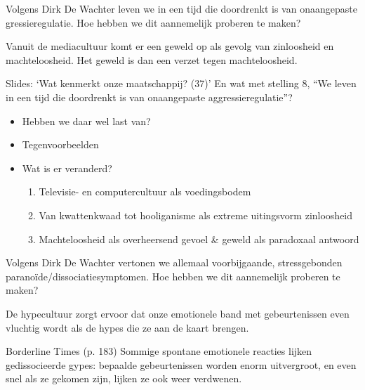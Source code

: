 \documentclass[main.tex]{subfiles}
\begin{document}
\begin{examenvraag}
    \begin{vraag}
        Volgens Dirk De Wachter leven we in een tijd die doordrenkt is van onaangepaste gressieregulatie. Hoe hebben we dit aannemelijk proberen te maken?
    \end{vraag}

    \begin{antwoord}
        Vanuit de mediacultuur komt er een geweld op als gevolg van zinloosheid en machteloosheid.
        Het geweld is dan een verzet tegen machteloosheid.
        \begin{citaat}{Slides: `Wat kenmerkt onze maatschappij? (37)'}
            En wat met stelling 8, ``We leven in een tijd die doordrenkt is van onaangepaste aggressieregulatie''?
            \begin{itemize}
                \item Hebben we daar wel last van?
                \item Tegenvoorbeelden
                \item Wat is er veranderd?
                    \begin{enumerate}
                        \item Televisie- en computercultuur als voedingsbodem
                        \item Van kwattenkwaad tot hooliganisme als extreme uitingsvorm zinloosheid
                        \item Machteloosheid als overheersend gevoel \& geweld als paradoxaal antwoord
                    \end{enumerate}
            \end{itemize}
        \end{citaat}
    \end{antwoord}
\end{examenvraag}


\begin{examenvraag}
    \begin{vraag}
        Volgens Dirk De Wachter vertonen we allemaal voorbijgaande, stressgebonden paranoïde/dissociatiesymptomen. Hoe hebben we dit aannemelijk proberen te maken?
    \end{vraag}

    \begin{antwoord}
        De hypecultuur zorgt ervoor dat onze emotionele band met gebeurtenissen even vluchtig wordt als de hypes die ze aan de kaart brengen.
        \begin{citaat}{Borderline Times (p. 183)}
            Sommige spontane emotionele reacties lijken gedissocieerde gypes: bepaalde gebeurtenissen worden enorm uitvergroot, en even snel als ze gekomen zijn, lijken ze ook weer verdwenen.
        \end{citaat}
    \end{antwoord}
\end{examenvraag}
\end{document}
